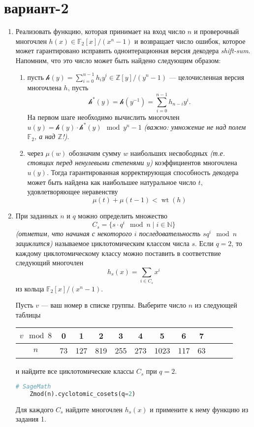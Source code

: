 \documentclass[12pt,letterpaper]{article}
\newcommand{\ZZ}{\mathds{Z}}
\newcommand{\NN}{\mathds{N}}
\newcommand{\FF}{\mathds{F}}
\begin{document}
\section*{вариант-2}
\begin{enumerate}[\bfseries 1.]
  \item Реализовать функцию, которая принимает на вход число $n$ и проверочный многочлен $h(x) \in \FF_2[x]/(x^n-1)$ и возвращает число ошибок, которое может гарантировано исправить одноитерационная версия декодера \emph{shift-sum}. Напомним, что это число может быть найдено следующим образом:
  \begin{enumerate}[\it i)]
    \item пусть $\mathcal{h}(y) = \sum_{i=0}^{n-1} h_i y^i \in \ZZ[y]/(y^n - 1)$ --- целочисленная версия многочлена $h$, пусть
    \[ \mathcal{h}^*(y) = \mathcal{h}(y^{-1}) = \sum_{i=0}^{n-1} h_{n-i} y^{i}. \]
    На первом шаге необходимо вычислить многочлен $u(y) = \mathcal{h}(y) \cdot \mathcal{h}^*(y) \mod y^n - 1$ \emph{(важно: умножение не над полем $\FF_2$, а над $\ZZ$!)}.
    \item через $\mu(w)$ обозначим сумму $w$ наибольших несвободных \emph{(т.е. стоящих перед ненулевыми степенями $y$)} коэффициентов многочлена $u(y)$. Тогда гарантированная корректирующая способность декодера может быть найдена как наибольшее натуральное число $t$, удовлетворяющее неравенству
    \[ \mu(t) + \mu(t-1) < \operatorname{wt}(h) \]
  \end{enumerate}
  \item При заданных $n$ и $q$ можно определить множество
  \[ C_{s} = \{ s \cdot q^i \mod n \mid i \in \NN \} \]
  \emph{(отметим, что начиная с некоторого $i$ последовательность $s q^i \mod n$ зациклится)} называемое циклотомическим классом числа $s$. 
  Если $q = 2$, то каждому циклотомическому классу можно поставить в соответствие следующий многочлен
  \[ h_s(x) = \sum_{i \in C_{s}} x^i \]
  из кольца $\FF_2[x]/(x^n-1)$.
  
  Пусть $v$ --- ваш номер в списке группы. Выберите число $n$ из следующей таблицы
  \begin{center}
    \begin{tabular}{c|ccccccccccc}
      $v \mod 8$ & 0&1&2&3&4&5&6&7 \\ \hline
      $n$ & 73 & 127 & 819 & 255 & 273 & 1023 & 117 & 63
    \end{tabular}    
  \end{center}
  и найдите все циклотомические классы $C_s$ при $q=2$.
  \begin{lstlisting}[language=Python]
    # SageMath
    Zmod(n).cyclotomic_cosets(q=2)  \end{lstlisting}
  Для каждого $C_s$ найдите многочлен $h_s(x)$ и примените к нему функцию из задания 1.
\end{enumerate}
\end{document}
